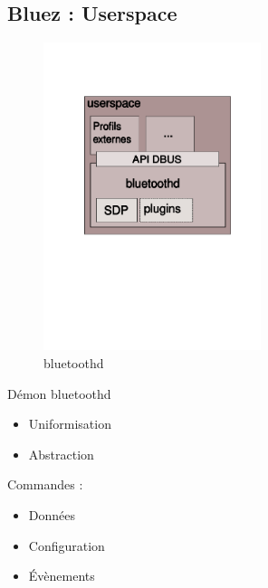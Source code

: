 \subsection{Bluez : Userspace}
\begin{frame}
\begin{minipage}[t]{0.60\linewidth}
	\begin{figure}
		\includegraphics[height=9cm]{bluetoothd.png}
		\caption{bluetoothd}
	\end{figure}
\end{minipage}
\begin{minipage}[t]{0.30\linewidth}
	\begin{block}{Démon bluetoothd}
		\begin{itemize}
			\item Uniformisation
			\item Abstraction
		\end{itemize}
		Commandes : 
		\begin{itemize}
			\item Données
			\item Configuration
			\item Évènements
		\end{itemize}
	\end{block}
\end{minipage}
\end{frame}

